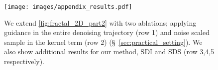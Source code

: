 \begin{figure}[h]
    \centering
    \texttt{[image: images/appendix\_results.pdf]}
\vspace{-2mm}
\caption{We extend \cref{fig:fractal_2D_part2} with two ablations; applying guidance in the entire denoising trajectory (row 1) and noise scaled sample in the kernel term (row 2) (§~\ref{sec:practical_setting}). We also show additional results for our method, SDI and SDS (row 3,4,5 respectively).}
\label{fig:appendix_results}
\vspace{-3mm}
\end{figure}